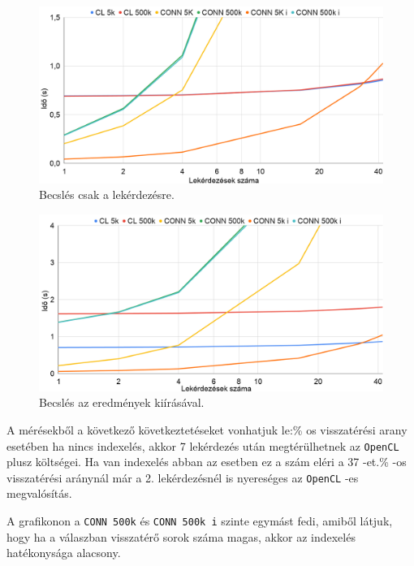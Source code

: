 \begin{figure}[h!]
\centering
\includegraphics[width=\textwidth]{images/test/where.png}
\caption{Becslés csak a lekérdezésre.}
\label{fig:schema}
\end{figure}

\begin{figure}[h!]
\centering
\includegraphics[width=\textwidth]{images/test/where_write.png}
\caption{Becslés az eredmények kiírásával.}
\label{fig:schema}
\end{figure}

A mérésekből a következő következtetéseket vonhatjuk le:\% os visszatérési arany esetében ha nincs indexelés, akkor 7 lekérdezés után megtérülhetnek az \texttt{OpenCL} plusz költségei.
Ha van indexelés abban az esetben ez a szám eléri a 37 -et.\% -os visszatérési aránynál már a 2. lekérdezésnél is nyereséges az \texttt{OpenCL} -es megvalósítás. 

A grafikonon a \texttt{CONN 500k} és \texttt{CONN 500k i} szinte egymást fedi, amiből látjuk, hogy ha a válaszban visszatérő sorok száma magas, akkor az indexelés hatékonysága alacsony.

